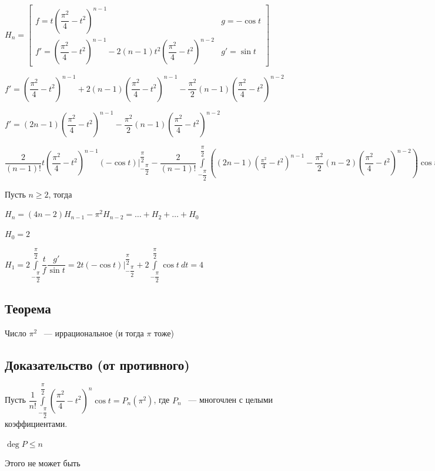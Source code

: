 \documentclass{article}
\begin{document}
			$H_n = \begin{bmatrix} f = t \left(\dfrac{\pi^2}{4} - t^2\right)^{n - 1} & g = -\cos t \\ f' = \left(\dfrac{\pi^2}{4} - t^2\right)^{n - 1} - 2(n - 1)t^2\left(\dfrac{\pi^2}{4} - t^2\right)^{n - 2} & g' = \sin t \end{bmatrix}$
			
			$f' = \left(\dfrac{\pi^2}{4} - t^2\right)^{n - 1} + 2(n - 1)\left(\dfrac{\pi^2}{4} - t^2\right)^{n - 1} - \dfrac{\pi^2}{2} (n - 1) \left(\dfrac{\pi^2}{4} - t^2\right)^{n - 2}$
			
			$f' = (2n - 1)\left(\dfrac{\pi^2}{4} - t^2\right)^{n - 1} - \dfrac{\pi^2}{2}(n - 1)\left(\dfrac{\pi^2}{4}-t^2\right)^{n - 2}$
			
			$\dfrac{2}{(n - 1)!} t \left(\dfrac{\pi^2}{4} - t^2\right)^{n - 1} (-\cos t) \bigg|^{\dfrac{\pi}{2}}_{-\dfrac{\pi}{2}} - \dfrac{2}{(n - 1)!} \int\limits^{\dfrac{\pi}{2}}_{-\dfrac{\pi}{2}} \left( (2n - 1)\left(\frac{\pi^2}{4} - t^2\right)^{n - 1} - \dfrac{\pi^2}{2} (n - 2) \left(\dfrac{\pi^2}{4} - t^2\right)^{n - 2}\right) \cos t \ dt$
			
			Пусть $n \geq 2$, тогда
			
			$H_n = (4n - 2) H_{n - 1} - \pi^2 H_{n - 2} = \ldots + H_2 + \ldots + H_0$
			
			$H_0 = 2$
			
			$H_1 = 2 \int\limits^{\dfrac{\pi}{2}}_{-\dfrac{\pi}{2}} \dfrac{t}{f} \dfrac{g'}{\sin t} = 2t (- \cos t)\bigg|^{\dfrac{\pi}{2}}_{-\dfrac{\pi}{2}} + 2 \int\limits^{\dfrac{\pi}{2}}_{-\dfrac{\pi}{2}} \cos t \ dt = 4$
			
		\subsection{Теорема}
		
			Число $\pi^2$ ~--- иррациональное (и тогда $\pi$ тоже)
			
		\subsection{Доказательство (от противного)}
		
			Пусть $\dfrac{1}{n!} \int\limits^{\dfrac{\pi}{2}}_{-\dfrac{\pi}{2}} \left(\dfrac{\pi^2}{4} - t^2\right)^n \cos t = P_n (\pi^2)$, где $P_n$ ~--- многочлен с целыми коэффициентами.
			
			$\deg P \leq n$
			
			Этого не может быть
			
\end{document}
